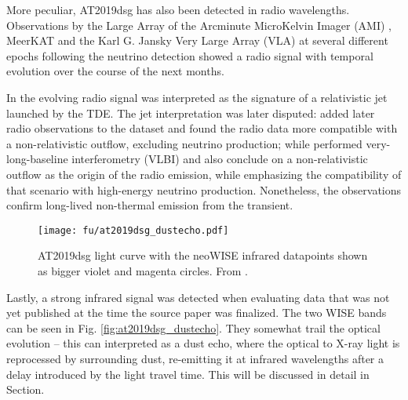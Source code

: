 More peculiar, AT2019dsg has also been detected in radio wavelengths. Observations by the Large Array of the Arcminute MicroKelvin Imager (AMI) , MeerKAT  and the Karl G. Jansky Very Large Array (VLA)  at several different epochs following the neutrino detection showed a radio signal with temporal evolution over the course of the next months.

In \cite{Stein2021} the evolving radio signal was interpreted as the signature of a relativistic jet launched by the TDE. The jet interpretation was later disputed:  added later radio observations to the dataset and found the radio data more compatible with a non-relativistic outflow, excluding neutrino production; while  performed very-long-baseline interferometry (VLBI) and also conclude on a non-relativistic outflow as the origin of the radio emission, while emphasizing the compatibility of that scenario with high-energy neutrino production. Nonetheless, the observations confirm long-lived non-thermal emission from the transient.

\begin{figure}[htb]
    \texttt{[image: fu/at2019dsg\_dustecho.pdf]}
    \caption[AT2019dsg infrared light curve]{AT2019dsg light curve with the neoWISE infrared datapoints shown as bigger violet and magenta circles. From \cite{Reusch2023b}.}
\end{figure}

Lastly, a strong infrared signal was detected when evaluating  data that was not yet published at the time the source paper was finalized. The two WISE bands can be seen in Fig. \ref{fig:at2019dsg_dustecho}. They somewhat trail the optical evolution -- this can interpreted as a dust echo, where the optical to X-ray light is reprocessed by surrounding dust, re-emitting it at infrared wavelengths after a delay introduced by the light travel time. This will be discussed in detail in Section.